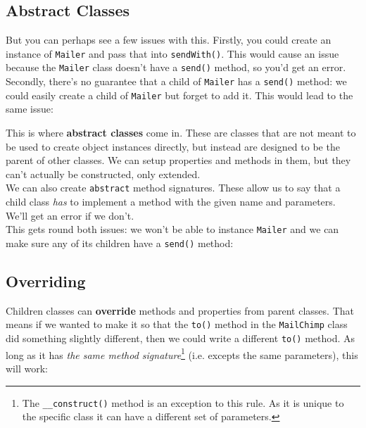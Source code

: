 

\subsection{Abstract Classes}

But you can perhaps see a few issues with this. Firstly, you could create an instance of \texttt{Mailer} and pass that into \texttt{sendWith()}. This would cause an issue because the \texttt{Mailer} class doesn't have a \texttt{send()} method, so you'd get an error. Secondly, there's no guarantee that a child of \texttt{Mailer} has a \texttt{send()} method: we could easily create a child of \texttt{Mailer} but forget to add it. This would lead to the same issue:


This is where \textbf{abstract classes} come in. These are classes that are not meant to be used to create object instances directly, but instead are designed to be the parent of other classes. We can setup properties and methods in them, but they can't actually be constructed, only extended.
\\

We can also create \texttt{abstract} method signatures. These allow us to say that a child class \textit{has} to implement a method with the given name and parameters. We'll get an error if we don't.
\\

This gets round both issues: we won't be able to instance \texttt{Mailer} and we can make sure any of its children have a \texttt{send()} method:



\subsection{Overriding}

Children classes can \textbf{override} methods and properties from parent classes. That means if we wanted to make it so that the \texttt{to()} method in the \texttt{MailChimp} class did something slightly different, then we could write a different \texttt{to()} method. As long as it has \textit{the same method signature}\footnote{The \texttt{\_\_construct()} method is an exception to this rule. As it is unique to the specific class it can have a different set of parameters.} (i.e. excepts the same parameters), this will work:

